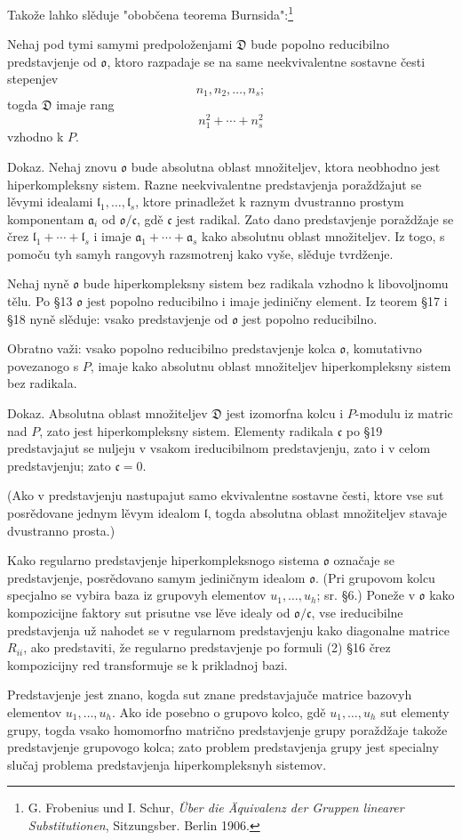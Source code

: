 \documentclass[11pt]{article}
\providecommand{\mo}{\mathfrak{o}}
\providecommand{\ma}{\mathfrak{a}}
\providecommand{\ml}{\mathfrak{l}}
\providecommand{\mc}{\mathfrak{c}}
\providecommand{\mD}{\mathfrak{D}}
\begin{document}
Takože lahko slěduje "obobčena teorema Burnsida":\footnote{G. Frobenius und I. Schur, \emph{Über die Äquivalenz der Gruppen linearer Substitutionen}, Sitzungsber. Berlin 1906.}

Nehaj pod tymi samymi predpoloženjami $\mD$ bude popolno reducibilno predstavjenje od $\mo$, ktoro razpadaje se na same neekvivalentne sostavne česti stepenjev
\[
        n_1,n_2,\ldots,n_s;
\]
togda $\mD$ imaje rang
\[
        n_1^2+\cdots+n_s^2
\]
vzhodno k $P$.

Dokaz. Nehaj znovu $\mo$ bude absolutna oblast množiteljev, ktora neobhodno jest hiperkompleksny sistem. Razne neekvivalentne predstavjenja poraždžajut se lěvymi idealami $\ml_1,\ldots,\ml_s$, ktore prinadležet k raznym dvustranno prostym komponentam $\ma_i$ od $\mo/\mc$, gdě $\mc$ jest radikal. Zato dano predstavjenje poraždžaje se črez $\ml_1+\cdots+\ml_s$ i imaje $\ma_1+\cdots+\ma_s$ kako absolutnu oblast množiteljev. Iz togo, s pomoču tyh samyh rangovyh razsmotrenj kako vyše, slěduje tvrdženje.

Nehaj nyně $\mo$ bude hiperkompleksny sistem bez radikala vzhodno k libovoljnomu tělu. Po §13 $\mo$ jest popolno reducibilno i imaje jediničny element. Iz teorem §17 i §18 nyně slěduje: vsako predstavjenje od $\mo$ jest popolno reducibilno.

Obratno važi: vsako popolno reducibilno predstavjenje kolca $\mo$, komutativno povezanogo s $P$, imaje kako absolutnu oblast množiteljev hiperkompleksny sistem bez radikala.

Dokaz. Absolutna oblast množiteljev $\mD$ jest izomorfna kolcu i $P$-modulu iz matric nad $P$, zato jest hiperkompleksny sistem. Elementy radikala $\mc$ po §19 predstavjajut se nuljeju v vsakom ireducibilnom predstavjenju, zato i v celom predstavjenju; zato $\mc=0$.

(Ako v predstavjenju nastupajut samo ekvivalentne sostavne česti, ktore vse sut posrědovane jednym lěvym idealom $\ml$, togda absolutna oblast množiteljev stavaje dvustranno prosta.)

Kako regularno predstavjenje hiperkompleksnogo sistema $\mo$ označaje se predstavjenje, posrědovano samym jediničnym idealom $\mo$. (Pri grupovom kolcu specjalno se vybira baza iz grupovyh elementov $u_1,\ldots,u_h$; sr. §6.) Poneže v $\mo$ kako kompozicijne faktory sut prisutne vse lěve idealy od $\mo/\mc$, vse ireducibilne predstavjenja už nahodet se v regularnom predstavjenju kako diagonalne matrice $R_{ii}$, ako predstaviti, že regularno predstavjenje po formuli (2) §16 črez kompozicijny red transformuje se k prikladnoj bazi.

Predstavjenje jest znano, kogda sut znane predstavjajuče matrice bazovyh elementov $u_1,\ldots,u_h$. Ako ide posebno o grupovo kolco, gdě $u_1,\ldots,u_h$ sut elementy grupy, togda vsako homomorfno matrično predstavjenje grupy poraždžaje takože predstavjenje grupovogo kolca; zato problem predstavjenja grupy jest specialny slučaj problema predstavjenja hiperkompleksnyh sistemov.
\end{document}
